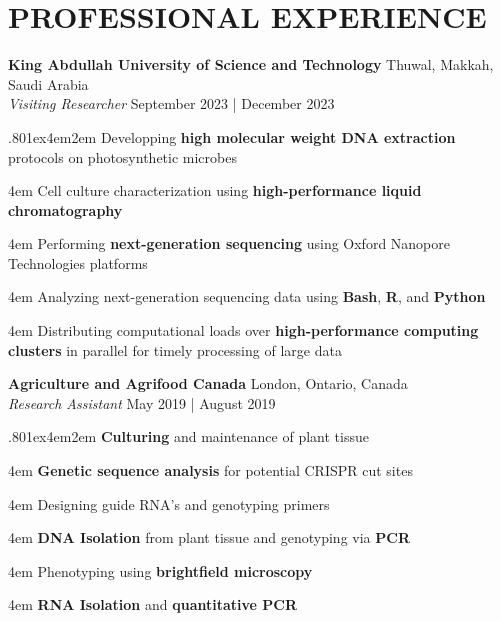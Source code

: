 \documentclass[a4paper,9pt]{extarticle}
\begin{document}
\section*{PROFESSIONAL EXPERIENCE}
\begin{minipage}{1\textwidth} 
\setlength{\parindent}{15pt} %
\noindent
	\textbf{King Abdullah University of Science and Technology} \hfill Thuwal, Makkah, Saudi Arabia\\ %
	\textit{Visiting Researcher} \hfill September 2023 | December 2023 \par %
	{\hsize.80\linewidth\parskip1ex\hangindent4em\parindent2em 
	\setlength{\parskip}{0pt} %
		Developping \textbf{high molecular weight DNA extraction} protocols on photosynthetic microbes\par
		\hangindent4em
		Cell culture characterization using \textbf{high-performance liquid chromatography}\par
		\hangindent4em
		Performing \textbf{next-generation sequencing} using Oxford Nanopore Technologies platforms\par
		\hangindent4em
		Analyzing next-generation sequencing data using \textbf{Bash}, \textbf{R}, and \textbf{Python}\par
		\hangindent4em
		Distributing computational loads over \textbf{high-performance computing clusters} in parallel for timely processing of large data\par}
\end{minipage}
\vspace{\parskip}

\noindent
\begin{minipage}{1\textwidth}
\setlength{\parindent}{15pt} %
	\noindent
	\textbf{Agriculture and Agrifood Canada} \hfill London, Ontario, Canada\\ %
	\textit{Research Assistant} \hfill May 2019 | August 2019  \par %
	{\hsize.80\linewidth\parskip1ex\hangindent4em\parindent2em 
	\setlength{\parskip}{0pt} %
		\textbf{Culturing} and maintenance of plant tissue\par
		\hangindent4em
		\textbf{Genetic sequence analysis} for potential CRISPR cut sites\par
		\hangindent4em
		Designing guide RNA's and genotyping primers\par
		\hangindent4em
		\textbf{DNA Isolation} from plant tissue and genotyping via \textbf{PCR}\par
		\hangindent4em
		Phenotyping using \textbf{brightfield microscopy}\par
		\hangindent4em
		\textbf{RNA Isolation} and \textbf{quantitative PCR}\par}
\end{minipage}
\vspace{\parskip}
\end{document}
